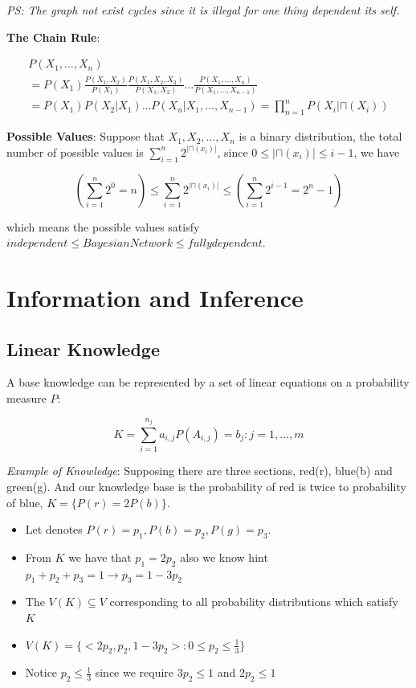 \documentclass{article}
\begin{document}
\textit{PS: The graph not exist cycles since it is illegal for one thing dependent its self.}

\textbf{The Chain Rule}: 

\begin{multline}
    P(X_1, ..., X_n) \\
    = P(X_1) \frac{P(X_1, X_2)}{P(X_1)} \frac{P(X_1, X_2, X_3)}{P(X_1, X_2)} \dots \frac{P(X_1, ..., X_n)}{P(X_1, \dots, X_{n-1})} \\
    = P(X_1)P(X_2|X_1)\dots P(X_n|X_1, ..., X_{n-1}) = \prod^n_{n=1}P(X_i| \sqcap(X_i))
\end{multline}

\textbf{Possible Values}: Suppose that $X_1, X_2, \dots, X_n$ is a binary distribution, the total number of possible values is $\sum^n_{i=1}2^{|\sqcap(x_i)|}$, since $0 \leq |\sqcap(x_i)| \leq i-1$, we have

\begin{equation}
    (\sum^n_{i=1}2^0=n) \leq \sum^n_{i=1}2^{|\sqcap(x_i)|} \leq (\sum^n_{i=1}2^{i-1} = 2^n-1)
\end{equation}

which means the possible values satisfy $independent \leq Bayesian Network \leq fully dependent$.



\section{Information and Inference}

\subsection{Linear Knowledge}

A base knowledge can be represented by a set of linear equations on a probability measure $P$:

\begin{equation}
    K = \sum^{n_j}_{i=1}a_{i,j}P(A_{i,j}) = b_j: j = 1, \dots,m
\end{equation}

\textit{Example of Knowledge}: Supposing there are three sections, red(r), blue(b) and green(g). And our knowledge base is the probability of red is twice to probability of blue, $K = \{ P(r) = 2P(b)\}$.

\begin{itemize}
    \item Let denotes $P(r) = p_1, P(b) = p_2, P(g) = p_3$.
    \item From $K$ we have that $p_1 = 2p_2$ also we know hint $p_1 + p_2 + p_3 = 1 \rightarrow p_3 = 1 - 3p_2$
    \item The $V(K) \subseteq V$ corresponding to all probability distributions which satisfy $K$
    \item $V(K) = \{ <2p_2, p_2, 1-3p_2> : 0 \leq p_2 \leq \frac{1}{3} \}$
    \item Notice $p_2 \leq \frac{1}{3}$ since we require $3p_2 \leq 1$ and $2p_2 \leq 1$
\end{itemize}
\end{document}
